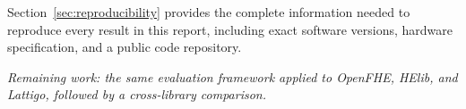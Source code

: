 \documentclass[11pt]{article}
\begin{document}
Section~\ref{sec:reproducibility} provides the complete information needed to reproduce every result in this report, including exact software versions, hardware specification, and a public code repository.

\vspace{0.3cm}
\noindent\textit{Remaining work: the same evaluation framework applied to OpenFHE, HElib, and Lattigo, followed by a cross-library comparison.}

\newpage










\end{document}
